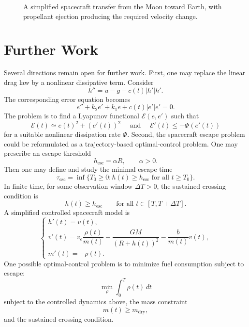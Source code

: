 ﻿\documentclass[12pt]{article}
\begin{document}
\begin{figure}[h]
\caption{A simplified spacecraft transfer from the Moon toward Earth, with propellant ejection producing the required velocity change.}
\label{fig:moon-earth-transfer}
\end{figure} 

\section{Further Work}
Several directions remain open for further work.
First, one may replace the linear drag law by a nonlinear dissipative term. Consider
\[
 h'' = u - g - c(t)|h'|h'.
\]
The corresponding error equation becomes
\[
 e'' + k_2e' + k_1e + c(t)|e'|e' = 0.
\]
The problem is to find a Lyapunov functional $\mathcal E(e, e')$ such that
\[
 \mathcal E(t)\simeq e(t)^2 + (e'(t))^2 \quad \text{ and }\quad
 \mathcal E'(t) \leq - \Phi(e'(t))
\]
for a suitable nonlinear dissipation rate $\Phi$.
Second, the spacecraft escape problem could be reformulated as a trajectory-based
optimal-control problem. One may prescribe an escape threshold
\[
 h_{\mathrm{esc}} = \alpha R,\qquad \alpha > 0.
\]
Then one may define and study the minimal escape time
\[
 \tau_{\mathrm{esc}}
 = \inf\{T_0 \geq 0: h(t) \geq h_{\mathrm{esc}}
 \text{ for all }t \geq T_0\}.
\]
In finite time, for some observation window $\Delta T>0$, the sustained crossing condition is
\[
 h(t) \geq h_{\mathrm{esc}}
 \qquad
 \text{for all }t \in [T, T + \Delta T].
\]
A simplified controlled spacecraft model is
\[
\begin{cases}
 h'(t) = v(t),\\[0.3em]
 v'(t)
 =
 v_e\dfrac{\rho(t)}{m(t)}
 -
 \dfrac{GM}{(R + h(t))^2}
 -
 \dfrac{b}{m(t)}v(t),\\[0.8em]
 m'(t) = -\rho(t).
\end{cases}
\]
One possible optimal-control problem is to minimize fuel consumption subject to escape:
\[
 \min_{\rho} \int_0^T \rho(t)\, dt
\]
subject to the controlled dynamics above, the mass constraint
\[
 m(t) \geq m_{\mathrm{dry}},
\]
and the sustained crossing condition.
\end{document}
